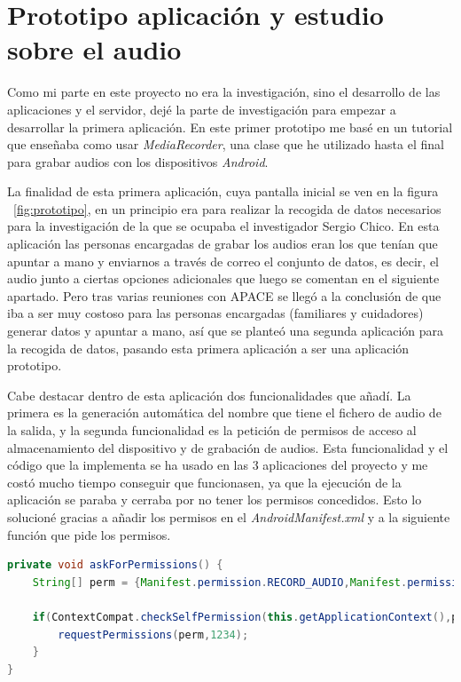 \section{Prototipo aplicación y estudio sobre el audio}
Como mi parte en este proyecto no era la investigación, sino el desarrollo de las aplicaciones y el servidor, dejé la parte de investigación para empezar a desarrollar la primera aplicación. En este primer prototipo me basé en un tutorial que enseñaba como usar \textit{MediaRecorder}, una clase que he utilizado hasta el final para grabar audios con los dispositivos \textit{Android}.

La finalidad de esta primera aplicación, cuya pantalla inicial se ven en la figura ~\ref{fig:prototipo}, en un principio era para realizar la recogida de datos necesarios para la investigación de la que se ocupaba el investigador Sergio Chico. En esta aplicación las personas encargadas de grabar los audios eran los que tenían que apuntar a mano y enviarnos a través de correo el conjunto de datos, es decir, el audio junto a ciertas opciones adicionales que luego se comentan en el siguiente apartado. Pero tras varias reuniones con APACE se llegó a la conclusión de que iba a ser muy costoso para las personas encargadas (familiares y cuidadores) generar datos y apuntar a mano, así que se planteó  una segunda aplicación para la recogida de datos, pasando esta primera aplicación a ser una aplicación prototipo. 

Cabe destacar dentro de esta aplicación dos funcionalidades que añadí. La primera es la generación automática del nombre que tiene el fichero de audio de la salida, y la segunda funcionalidad es la petición de permisos de acceso al almacenamiento del dispositivo y de grabación de audios. Esta funcionalidad y el código que la implementa se ha usado en las 3 aplicaciones del proyecto y me costó mucho tiempo conseguir que funcionasen, ya que la ejecución de la aplicación se paraba y cerraba por no tener los permisos concedidos. Esto lo solucioné gracias a añadir los permisos en el \textit{AndroidManifest.xml} y a la siguiente función que pide los permisos.

\begin{lstlisting}[language={Java}]
private void askForPermissions() {
	String[] perm = {Manifest.permission.RECORD_AUDIO,Manifest.permission.WRITE_EXTERNAL_STORAGE};
	
	if(ContextCompat.checkSelfPermission(this.getApplicationContext(),perm[0]) != PackageManager.PERMISSION_GRANTED || ContextCompat.checkSelfPermission(this.getApplicationContext(),perm[1]) != PackageManager.PERMISSION_GRANTED){
		requestPermissions(perm,1234);
	}
}	
\end{lstlisting}

